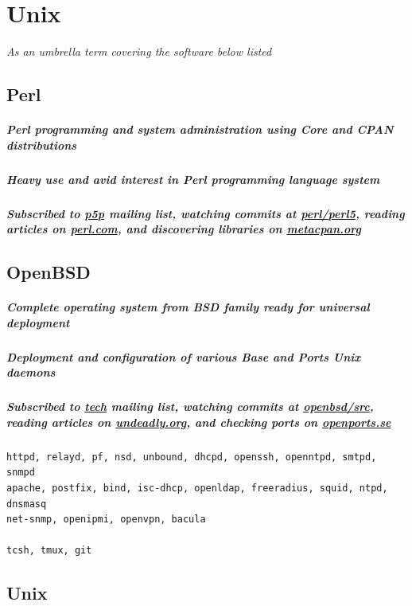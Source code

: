 \documentclass {article}
\begin{document}
    \section{Unix} %
    \textit{As an umbrella term covering the software below listed}

    \subsection{Perl}

    \subparagraph{Perl programming and system administration using Core and CPAN distributions}

    \subparagraph{Heavy use and avid interest in Perl programming language system}

    \subparagraph{Subscribed to \href{https://lists.perl.org/list/perl5-porters.html}{p5p} mailing list, watching commits at \href{https://github.com/Perl/perl5}{perl/perl5}, reading articles on \href{https://perl.com/}{perl.com}, and discovering libraries on \href{https://metacpan.org/}{metacpan.org}}

    \subsection{OpenBSD}

    \subparagraph{Complete operating system from BSD family ready for universal deployment}

    \subparagraph{Deployment and configuration of various Base and Ports Unix daemons}

    \subparagraph{Subscribed to \href{https://www.openbsd.org/mail.html}{tech} mailing list, watching commits at \href{https://github.com/openbsd/src}{openbsd/src}, reading articles on \href{https://undeadly.org//}{undeadly.org}, and checking ports on \href{https://openports.se/}{openports.se}}
    \begin{verbatim}
httpd, relayd, pf, nsd, unbound, dhcpd, openssh, openntpd, smtpd, snmpd
apache, postfix, bind, isc-dhcp, openldap, freeradius, squid, ntpd, dnsmasq
net-snmp, openipmi, openvpn, bacula

tcsh, tmux, git
    \end{verbatim}

    \subsection{Unix}
\end{document}
